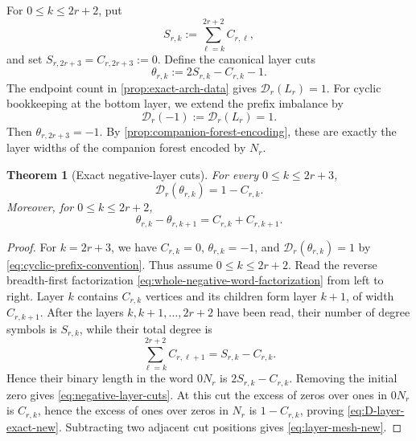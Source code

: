 \documentclass[11pt]{article}
\newtheorem{theorem}{Theorem}[section]
\theoremstyle{definition}
\theoremstyle{remark}
\begin{document}
For $0\le k\le2r+2$, put
\begin{equation}
S_{r,k}:=\sum_{\ell=k}^{2r+2}C_{r,\ell},
\label{eq:negative-layer-tail}
\end{equation}
and set $S_{r,2r+3}=C_{r,2r+3}:=0$.  Define the canonical layer cuts
\begin{equation}
\theta_{r,k}:=2S_{r,k}-C_{r,k}-1.
\label{eq:negative-layer-cuts}
\end{equation}
The endpoint count in \cref{prop:exact-arch-data} gives
\(\mathscr D_r(L_r)=1\).  For cyclic bookkeeping at the bottom layer, we
extend the prefix imbalance by
\begin{equation}
 \mathscr D_r(-1):=\mathscr D_r(L_r)=1.
 \label{eq:cyclic-prefix-convention}
\end{equation}
Then \(\theta_{r,2r+3}=-1\).
By \cref{prop:companion-forest-encoding}, these are exactly the layer widths
of the companion forest encoded by \(N_r\).

\begin{theorem}[Exact negative-layer cuts]
\label{thm:negative-layer-cuts}
For every $0\le k\le2r+3$,
\begin{equation}
{
\mathscr D_r(\theta_{r,k})=1-C_{r,k}.
}
\label{eq:D-layer-exact-new}
\end{equation}
Moreover, for \(0\le k\le2r+2\),
\begin{equation}
\theta_{r,k}-\theta_{r,k+1}=C_{r,k}+C_{r,k+1}.
\label{eq:layer-mesh-new}
\end{equation}
\end{theorem}

\begin{proof}
For \(k=2r+3\), we have \(C_{r,k}=0\), \(\theta_{r,k}=-1\), and
\(\mathscr D_r(\theta_{r,k})=1\) by
\eqref{eq:cyclic-prefix-convention}.  Thus assume \(0\le k\le2r+2\).
Read the reverse breadth-first factorization
\eqref{eq:whole-negative-word-factorization} from left to right.  Layer
$k$ contains $C_{r,k}$
vertices and its children form layer $k+1$, of width $C_{r,k+1}$.  After the
layers \(k,k+1,\ldots,2r+2\) have been read, their number of degree symbols is
$S_{r,k}$, while their total degree is
\[
 \sum_{\ell=k}^{2r+2}C_{r,\ell+1}
 =S_{r,k}-C_{r,k}.
\]
Hence their binary length in the word \(0N_r\) is
$2S_{r,k}-C_{r,k}$.  Removing the initial zero gives
\eqref{eq:negative-layer-cuts}.  At this cut the excess of zeros over ones in
$0N_r$ is $C_{r,k}$, hence the excess of ones over zeros in $N_r$ is
$1-C_{r,k}$, proving \eqref{eq:D-layer-exact-new}.  Subtracting two adjacent
cut positions gives \eqref{eq:layer-mesh-new}.
\end{proof}
\end{document}
